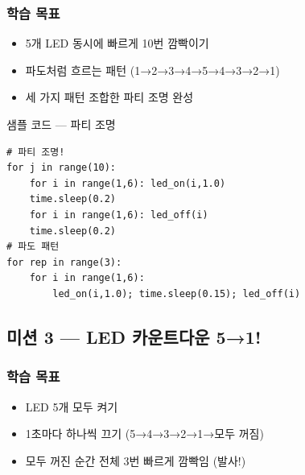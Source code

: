 \begin{storybox}
\end{storybox}

\subsubsection*{학습 목표}
\begin{itemize}[leftmargin=1.4em]
  \item 5개 LED 동시에 빠르게 10번 깜빡이기
  \item 파도처럼 흐르는 패턴 (1→2→3→4→5→4→3→2→1)
  \item 세 가지 패턴 조합한 파티 조명 완성
\end{itemize}

\begin{labbox}{샘플 코드 --- 파티 조명}
\begin{verbatim}
# 파티 조명!
for j in range(10):
    for i in range(1,6): led_on(i,1.0)
    time.sleep(0.2)
    for i in range(1,6): led_off(i)
    time.sleep(0.2)
# 파도 패턴
for rep in range(3):
    for i in range(1,6):
        led_on(i,1.0); time.sleep(0.15); led_off(i)
\end{verbatim}
\end{labbox}

\subsection{미션 3 --- LED 카운트다운 5→1!}
\label{subsec:ch10-m3}

\begin{storybox}
\end{storybox}

\subsubsection*{학습 목표}
\begin{itemize}[leftmargin=1.4em]
  \item LED 5개 모두 켜기
  \item 1초마다 하나씩 끄기 (5→4→3→2→1→모두 꺼짐)
  \item 모두 꺼진 순간 전체 3번 빠르게 깜빡임 (발사!)
\end{itemize}


